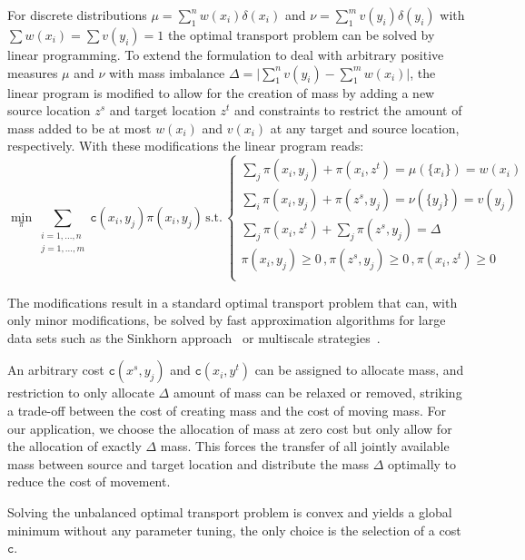 \documentclass{llncs}
\newcommand{\cost}[0]{\mathtt{c}}
\newcommand{\coupling}[0]{\pi}
\begin{document}
For discrete distributions $\mu = \sum_1^n w(x_i) \delta(x_i)$ and $ \nu =
\sum_1^m v(y_i) \delta(y_i)$ with $\sum w(x_i) = \sum v(y_i) = 1$ the optimal
transport problem can be solved by linear programming. To extend the
formulation to deal with arbitrary positive measures $\mu$ and $\nu$ with mass
imbalance  $\Delta = \lvert \sum_1^n v(y_i)  - \sum_1^m w(x_i) \rvert$, the
linear program is modified to allow for the creation of mass by adding a new
source location $z^s$ and target location $z^t$ and constraints to restrict the
amount of mass added to be at most $w(x_i)$ and $v(x_i)$ at any target and
source location, respectively. With these modifications the linear program reads: 
\begin{equation}
\min_\coupling \sum_{\substack{i=1,\dots,n\\ j=1,\dots,m}} 
      \cost(x_i, y_j) \coupling(x_i, y_j) \, \text{s.t.}\, 
\begin{cases}
  \sum_j \coupling(x_i, y_j) + \coupling(x_i, z^t) = \mu(\{x_i\}) = w(x_i) & \\ 
  \sum_i \coupling(x_i, y_j) + \coupling(z^s, y_j) = \nu(\{y_j\}) = v(y_j) & \\
  \sum_j \coupling(x_i, z^t) + \sum_j \coupling(z^s, y_j)  = \Delta \\
  \coupling(x_i, y_j) \ge 0 \,, \coupling(z^s, y_j) \ge 0 \,, \coupling(x_i,
  z^t) \ge 0  \\
\end{cases}
\label{eq:unbalanced}
\end{equation} 

The modifications result in a standard optimal transport problem that can, with
only minor modifications, be solved by fast approximation algorithms for large
data sets such as the Sinkhorn approach~\cite{cuturi2013sinkhorn} or multiscale
strategies~\cite{gerber2017multiscale}. 

An arbitrary cost $\cost(x^s, y_j)$ and  $\cost(x_i, y^t)$ can be assigned
to allocate mass, and restriction to only allocate $\Delta$ amount of mass can
be relaxed or removed, striking a trade-off between the cost of creating mass
and the cost of moving mass. For our application, we choose the allocation of
mass at zero cost but only allow for the allocation of exactly $\Delta$ mass.
This forces the transfer of all jointly available mass between source and
target location and distribute the mass $\Delta$ optimally to reduce the cost
of movement.

Solving the unbalanced optimal transport problem is convex and yields a global
minimum without any parameter tuning, the only choice is the selection of a
cost $\cost$.
\end{document}
